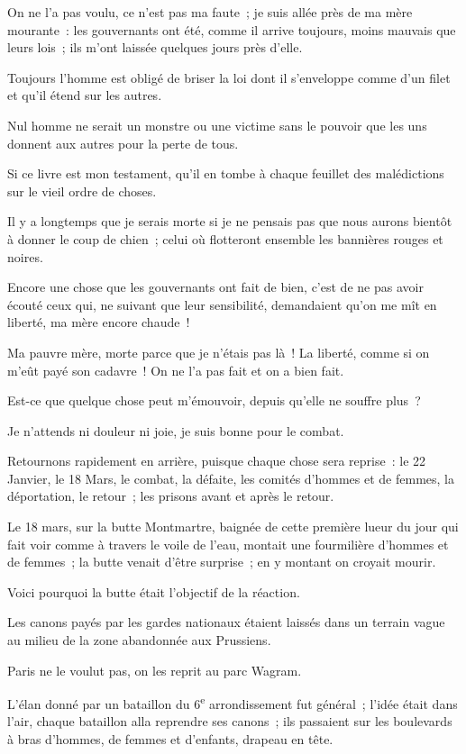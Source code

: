 \documentclass[french,twoside]{book} %
\begin{document}
On ne l’a pas voulu, ce n’est pas ma faute ; je suis allée près de ma mère mourante : les gouvernants ont été, comme il arrive toujours, moins mauvais que leurs lois ; ils m’ont laissée quelques jours près d’elle.\par
Toujours l’homme est obligé de briser la loi dont il s’enveloppe comme d’un filet et qu’il étend sur les autres.\par
Nul homme ne serait un monstre ou une victime sans le pouvoir que les uns donnent aux autres pour la perte de tous.\par
Si ce livre est mon testament, qu’il en tombe à chaque feuillet des malédictions sur le vieil ordre de choses.\par
Il y a longtemps que je serais morte si je ne pensais pas que nous aurons bientôt à donner le coup de chien ; celui où flotteront ensemble les bannières rouges et noires.\par
Encore une chose que les gouvernants ont fait de bien, c’est de ne pas avoir écouté ceux qui,  ne suivant que leur sensibilité, demandaient qu’on me mît en liberté, ma mère encore chaude !\par
Ma pauvre mère, morte parce que je n’étais pas là ! La liberté, comme si on m’eût payé son cadavre ! On ne l’a pas fait et on a bien fait.\par
Est-ce que quelque chose peut m’émouvoir, depuis qu’elle ne souffre plus ?\par
Je n’attends ni douleur ni joie, je suis bonne pour le combat.\par
Retournons rapidement en arrière, puisque chaque chose sera reprise : le 22 Janvier, le 18 Mars, le combat, la défaite, les comités d’hommes et de femmes, la déportation, le retour ; les prisons avant et après le retour.\par
\bigbreak
\noindent Le 18 mars, sur la butte Montmartre, baignée de cette première lueur du jour qui fait voir comme à travers le voile de l’eau, montait une fourmilière d’hommes et de femmes ; la butte venait d’être surprise ; en y montant on croyait mourir.\par
Voici pourquoi la butte était l’objectif de la réaction.\par
Les canons payés par les gardes nationaux étaient laissés dans un terrain vague au milieu de la zone abandonnée aux Prussiens.\par
 Paris ne le voulut pas, on les reprit au parc Wagram.\par
L’élan donné par un bataillon du 6\textsuperscript{e} arrondissement fut général ; l’idée était dans l’air, chaque bataillon alla reprendre ses canons ; ils passaient sur les boulevards à bras d’hommes, de femmes et d’enfants, drapeau en tête.\par
\end{document}
